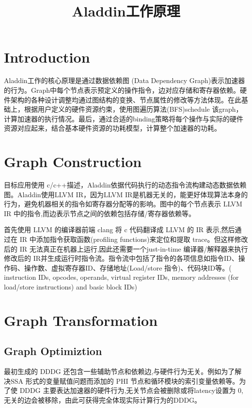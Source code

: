 \documentclass[UTF8]{scrartcl}
\title{Aladdin工作原理}
\author{}
\begin{document}
\maketitle


\section{Introduction}

	Aladdin工作的核心原理是通过数据依赖图 (Data Dependency	Graph)表示加速器的行为。Graph中每个节点表示预定义的操作指令，边对应存储和寄存器依赖。硬件架构的各种设计调整均通过图结构的变换、节点属性的修改等方法体现。在此基础上，根据用户定义的硬件资源约束，使用图遍历算法(BFS)schedule 该graph，计算加速器的执行情况。最后，通过合适的binding策略将每个操作与实际的硬件资源对应起来，结合基本硬件资源的功耗模型，计算整个加速器的功耗。
	
\section{Graph Construction}

	目标应用使用 c/c++描述，Aladdin依据代码执行的动态指令流构建动态数据依赖图。Aladdin使用LLVM IR，因为LLVM IR是机器无关的，能更好体现算法本身的行为，避免机器相关的指令如寄存器分配等的影响。图中的每个节点表示 LLVM IR 中的指令,而边表示节点之间的依赖包括存储/寄存器依赖等。
	
	
	首先使用 LLVM 的编译器前端 clang 将 c 代码翻译成 LLVM 的 IR 表示,然后通过在 IR 中添加指令获取函数(profiling functions)来定位和提取 trace。但这样修改后的 IR 无法真正在机器上运行,因此还需要一个just-in-time 编译器/解释器来执行修改后的 IR并生成运行时指令流。指令流中包括了指令的各项信息如指令ID、操作码、操作数、虚拟寄存器ID、存储地址(Load/store 指令)、代码块ID等。(	instruction IDs, opcodes, operands, virtual register IDs, memory addresses (for load/store instructions) and basic block IDs)

\section{Graph Transformation}

	\subsection{Graph Optimiztion}
	
		最初生成的 DDDG 还包含一些辅助节点和依赖边,与硬件行为无关。例如为了解决SSA 形式的变量赋值问题而添加的 PHI 节点和循环模块的索引变量依赖等。为了使	DDDG 主要表达加速器的硬件行为,无关节点会被删除或将latency设置为 0,无关的边会被移除，由此可获得完全体现实际计算行为的DDDG。
			
\end{document}

